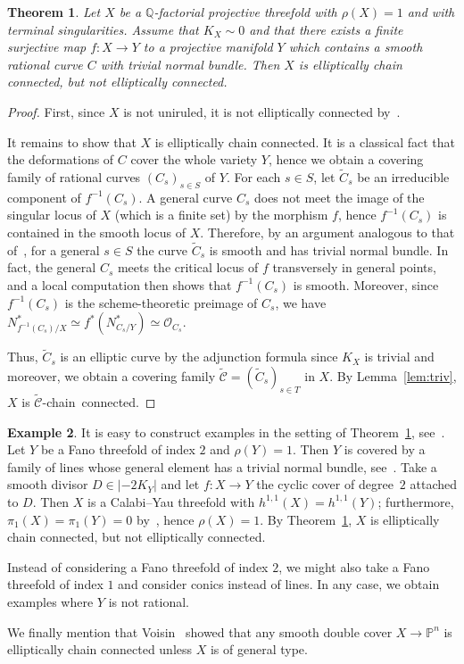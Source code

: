 \documentclass[11pt]{article}
\newtheorem{theo}{Theorem}[section]
\theoremstyle{definition}
\newtheorem{exem}[theo]{Example}
\numberwithin{equation}{section}
\numberwithin{figure}{section}
\numberwithin{table}{section}
\newcommand{\Qbb}{\mathbb{Q}} %
\newcommand{\PS}{\mathbb{P}}
\newcommand\sO{\mathcal{O}}
\newcommand\sC{\mathcal{C}}
\begin{document}
\begin{theo}\label{thm:map}
Let $X$ be a $\Qbb$-factorial projective threefold with $\rho(X) = 1$ and with terminal singularities. Assume that $K_X\sim0$ and that there exists a finite surjective map $f\colon X \to Y$ to a projective manifold $Y$ which contains a smooth rational curve $C$ with trivial normal bundle. Then $X$ is elliptically chain connected, but not elliptically connected.
\end{theo}

\begin{proof}
First, since $X$ is not uniruled, it is not elliptically connected by~\cite[Theorem~6.2]{Gou16}.

It remains to show that $X$ is elliptically chain connected. It is a classical fact that the deformations of $C$ cover the whole variety $Y$, hence we obtain a covering family of rational curves $(C_s)_{s \in S}$ of $Y$. For each $s\in S$, let $\widetilde C_s $ be an irreducible component of $f^{-1}(C_s)$. A general curve $C_s$ does not meet the image of the singular locus of $X$ (which is a finite set) by the morphism $f$, hence $f^{-1}(C_s)$ is contained in the smooth locus of $X$. Therefore, by an argument analogous to that of~\cite[Lemma~2.2.3]{Ame04}, for a general $s\in S$ the curve $\widetilde C_s$ is smooth and has trivial normal bundle. In fact, the general $C_s$ meets the critical locus of $f$ transversely in general points, and a local computation then shows that $f^{-1}(C_s)$ is smooth. Moreover, since $f^{-1}(C_s)$ is the scheme-theoretic preimage of $C_s$, we have $N^*_{f^{-1}(C_s)/X} \simeq f^*(N^*_{C_s/Y}) \simeq \sO_{C_s}.$

Thus, $\widetilde C_s$ is an elliptic curve by the adjunction formula since $K_X$ is trivial and moreover, we obtain a covering family $\widetilde{\sC}=(\widetilde C_s)_{s \in T}$ in $X$. By Lemma~\ref{lem:triv}, $X$ is $\widetilde{\sC}$-chain~connected.
\end{proof}

\begin{exem}\label{ex}
It is easy to construct examples in the setting of Theorem~\ref{thm:map}, see~\cite[Theorem~1]{Cy03}. Let $Y$ be a Fano threefold of index $2$ and $\rho(Y) = 1$. Then $Y$ is covered by a family of lines whose general element has a trivial normal bundle, see~\cite[Chapter~3]{IP99}. Take a smooth divisor $D \in | {-}2K_Y |$ and let $f\colon X \to Y$ the cyclic cover of degree~$2$ attached to $D$. Then $X$ is a Calabi--Yau threefold with $h^{1,1}(X) = h^{1,1}(Y)$; furthermore, $\pi_1(X) = \pi_1(Y) = 0 $ by~\cite{Cor81}, hence $\rho(X)=1$. By Theorem~\ref{thm:map}, $X$ is elliptically chain connected, but not elliptically connected.

Instead of considering a Fano threefold of index $2$, we might also take a Fano threefold of index $1$ and consider conics instead of lines. In any case, we obtain examples where $Y$ is not rational.

We finally mention that Voisin~\cite[Example~2.17]{Voi03} showed that any smooth double cover $X \to \PS^n$ is elliptically chain connected unless $X$ is of general type.
\end{exem}
\end{document}
